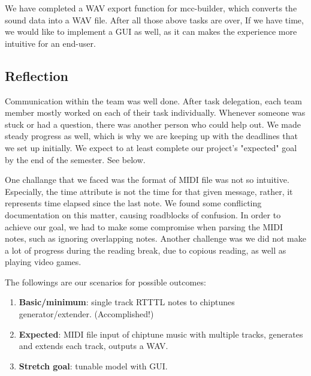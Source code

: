 \documentclass{article}
\begin{document}
We have completed a WAV export function for mcc-builder, which converts the sound data into a WAV file. After all those above tasks are over, If we have time, we would like 
to implement a GUI as well, as it can makes the experience more intuitive for an end-user. 

\subsection{Reflection}
Communication within the team was well done. After task delegation, each team member mostly worked on each of their task individually. Whenever someone was stuck or had 
a question, there was another person who could help out. We made steady progress as well, which is why we are keeping up with the deadlines that we set up initially. We 
expect to at least complete our project's "expected" goal by the end of the semester. See below.

One challange that we faced was the format of MIDI file was not so intuitive. Especially, the time attribute is not the time for that given message, rather, it represents 
time elapsed since the last note. We found some conflicting documentation on this matter, causing roadblocks of confusion. In order to achieve our goal, we had to make some 
compromise when parsing the MIDI notes, such as ignoring overlapping notes. Another challenge was we did not make a lot of progress during the reading break, due to 
copious reading, as well as playing video games.

The followings are our scenarios for possible outcomes:
\begin{enumerate}
  \item \textbf{Basic/minimum}: single track RTTTL notes to chiptunes generator/extender. (Accomplished!)
  \item \textbf{Expected}: MIDI file input of chiptune music with multiple tracks, generates and extends each track, outputs a WAV.
  \item \textbf{Stretch goal}: tunable model with GUI.
\end{enumerate}
\end{document}
